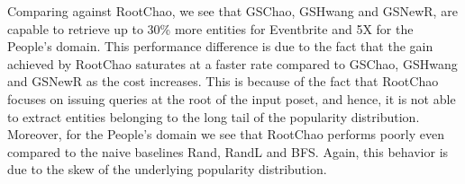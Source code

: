 Comparing against RootChao, we see that GSChao, GSHwang and GSNewR, are capable to retrieve up to 30\% more entities for Eventbrite and 5X for the People's domain. This performance difference is due to the fact that the gain achieved by RootChao saturates at a faster rate compared to GSChao, GSHwang and GSNewR as the cost increases. This is because of the fact that RootChao focuses on issuing queries at the root of the input poset, and hence, it is not able to extract entities belonging to the long tail of the popularity distribution. Moreover, for the People's domain we see that RootChao performs poorly even compared to the naive baselines Rand, RandL and BFS. Again, this behavior is due to the skew of the underlying popularity distribution.

\begin{figure}[h]
\begin{center}

\end{center}
\end{figure}
